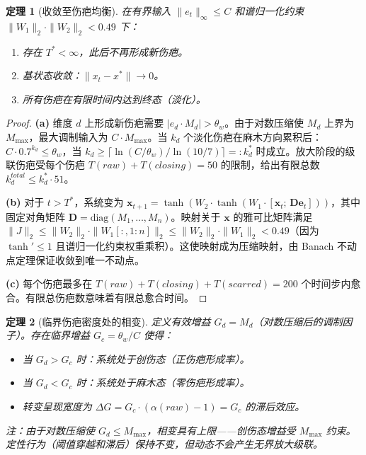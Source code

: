 \documentclass[11pt]{article}
\newtheorem{theorem}{定理}[section]
\begin{document}
\begin{theorem}[收敛至伤疤均衡]
\label{thm:scar-convergence}
在有界输入 $\|e_t\|_\infty \leq C$ 和谱归一化约束 $\|W_1\|_2 \cdot \|W_2\|_2 < 0.49$ 下：
\begin{enumerate}[label=(\alph*)]
\item 存在 $T^* < \infty$，此后不再形成新伤疤。
\item 基状态收敛：$\|x_t - x^*\| \to 0$。
\item 所有伤疤在有限时间内达到终态（淡化）。
\end{enumerate}
\end{theorem}

\begin{proof}
\textbf{(a)} 维度 $d$ 上形成新伤疤需要 $|e_d \cdot M_d| > \theta_w$。由于对数压缩使 $M_d$ 上界为 $M_{\max}$，最大调制输入为 $C \cdot M_{\max}$。当 $k_d$ 个淡化伤疤在麻木方向累积后：$C \cdot 0.7^{k_d} \leq \theta_w$，当 $k_d \geq \lceil \ln(C/\theta_w) / \ln(10/7) \rceil =: k_d^*$ 时成立。放大阶段的级联伤疤受每个伤疤 $T(raw) + T(closing) = 50$ 的限制，给出有限总数 $k_d^{total} \leq k_d^* \cdot 51$。

\textbf{(b)} 对于 $t > T^*$，系统变为 $\mathbf{x}_{t+1} = \tanh(W_2 \cdot \tanh(W_1 \cdot [\mathbf{x}_t;\, \mathbf{D}\mathbf{e}_t]))$，其中固定对角矩阵 $\mathbf{D} = \text{diag}(M_1, \ldots, M_n)$。映射关于 $\mathbf{x}$ 的雅可比矩阵满足 $\|J\|_2 \leq \|W_2\|_2 \cdot \|W_1[:, 1{:}n]\|_2 \leq \|W_2\|_2 \cdot \|W_1\|_2 < 0.49$（因为 $\tanh' \leq 1$ 且谱归一化约束权重乘积）。这使映射成为压缩映射，由 Banach 不动点定理保证收敛到唯一不动点。

\textbf{(c)} 每个伤疤最多在 $T(raw) + T(closing) + T(scarred) = 200$ 个时间步内愈合。有限总伤疤数意味着有限总愈合时间。
\end{proof}

\begin{theorem}[临界伤疤密度处的相变]
\label{thm:scar-phase}
定义有效增益 $G_d = M_d$（对数压缩后的调制因子）。存在临界增益 $G_c = \theta_w / C$ 使得：
\begin{itemize}
\item 当 $G_d > G_c$ 时：系统处于\emph{创伤态}（正伤疤形成率）。
\item 当 $G_d < G_c$ 时：系统处于\emph{麻木态}（零伤疤形成率）。
\item 转变呈现宽度为 $\Delta G = G_c \cdot (\alpha(raw) - 1) = G_c$ 的滞后效应。
\end{itemize}
注：由于对数压缩使 $G_d \leq M_{\max}$，相变具有上限——创伤态增益受 $M_{\max}$ 约束。定性行为（阈值穿越和滞后）保持不变，但动态不会产生无界放大级联。
\end{theorem}
\end{document}
